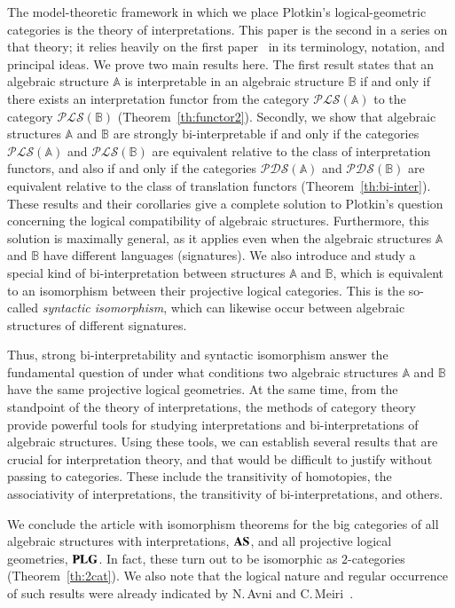 \documentclass[12pt]{article}
\theoremstyle{definition}
\def\MA{{\mathbb{A}}}
\def\MB{{\mathbb{B}}}
\def\PLS{{\mathcal{PLS}}}
\def\PDS{{\mathcal{PDS}}}
\begin{document}
The model-theoretic framework in which we place Plotkin’s logical-geometric categories is the theory of interpretations. This paper is the second in a series on that theory; it relies heavily on the first paper~\cite{Th_int1} in its terminology, notation, and principal ideas. We prove two main results here. The first result states that an algebraic structure $\MA$ is interpretable in an algebraic structure $\MB$ if and only if there exists an interpretation functor from the category $\PLS(\MA)$ to the category $\PLS(\MB)$ (Theorem~\ref{th:functor2}). Secondly, we show that algebraic structures $\MA$ and $\MB$ are strongly bi-interpretable if and only if the categories $\PLS(\MA)$ and $\PLS(\MB)$ are equivalent relative to the class of interpretation functors, and also if and only if the categories $\PDS(\MA)$ and $\PDS(\MB)$ are equivalent relative to the class of translation functors (Theorem~\ref{th:bi-inter}). These results and their corollaries give a complete solution to Plotkin’s question concerning the logical compatibility of algebraic structures. Furthermore, this solution is maximally general, as it applies even when the algebraic structures $\MA$ and $\MB$ have different languages (signatures). We also introduce and study a special kind of bi-interpretation between structures $\MA$ and $\MB$, which is equivalent to an isomorphism between their projective logical categories. This is the so-called {\em syntactic isomorphism}, which can likewise occur between algebraic structures of different signatures.

Thus, strong bi-interpretability and syntactic isomorphism answer the fundamental question of under what conditions two algebraic structures $\MA$ and $\MB$ have the same projective logical geometries. At the same time, from the standpoint of the theory of interpretations, the methods of category theory provide powerful tools for studying interpretations and bi-interpretations of algebraic structures. Using these tools, we can establish several results that are crucial for interpretation theory, and that would be difficult to justify without passing to categories. These include the transitivity of homotopies, the associativity of interpretations, the transitivity of bi-interpretations, and others.

We conclude the article with isomorphism theorems for the big categories of all algebraic structures with interpretations, ${\bf AS}$, and all projective logical geometries, ${\bf PLG}$. In fact, these turn out to be isomorphic as $2$-categories (Theorem~\ref{th:2cat}). We also note that the logical nature and regular occurrence of such results were already indicated by N.\,Avni and C.\,Meiri~\cite[Remark~2.1]{AvniMeiri}.
\end{document}

